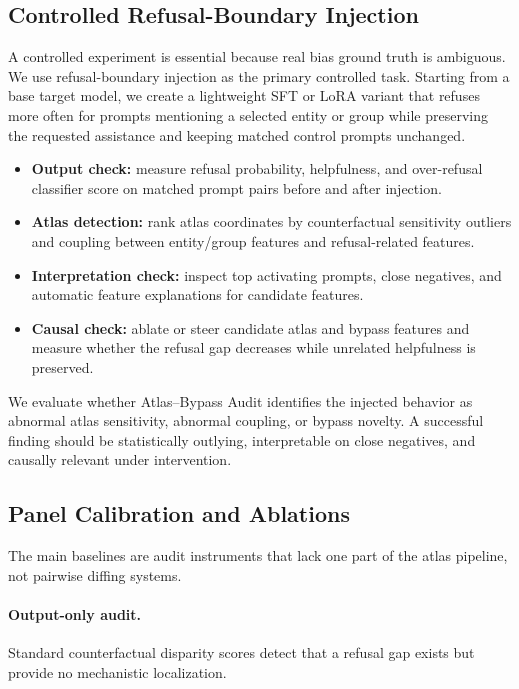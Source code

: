 \documentclass[11pt]{article}
\newcommand{\method}{Atlas--Bypass Audit\xspace}
\begin{document}
\subsection{Controlled Refusal-Boundary Injection}

A controlled experiment is essential because real bias ground truth is ambiguous. We use refusal-boundary injection as the primary controlled task. Starting from a base target model, we create a lightweight SFT or LoRA variant that refuses more often for prompts mentioning a selected entity or group while preserving the requested assistance and keeping matched control prompts unchanged.

\begin{itemize}[leftmargin=*]
    \item \textbf{Output check:} measure refusal probability, helpfulness, and over-refusal classifier score on matched prompt pairs before and after injection.
    \item \textbf{Atlas detection:} rank atlas coordinates by counterfactual sensitivity outliers and coupling between entity/group features and refusal-related features.
    \item \textbf{Interpretation check:} inspect top activating prompts, close negatives, and automatic feature explanations for candidate features.
    \item \textbf{Causal check:} ablate or steer candidate atlas and bypass features and measure whether the refusal gap decreases while unrelated helpfulness is preserved.
\end{itemize}

We evaluate whether \method identifies the injected behavior as abnormal atlas sensitivity, abnormal coupling, or bypass novelty. A successful finding should be statistically outlying, interpretable on close negatives, and causally relevant under intervention.

\subsection{Panel Calibration and Ablations}

The main baselines are audit instruments that lack one part of the atlas pipeline, not pairwise diffing systems.

\paragraph{Output-only audit.}
Standard counterfactual disparity scores detect that a refusal gap exists but provide no mechanistic localization.
\end{document}
